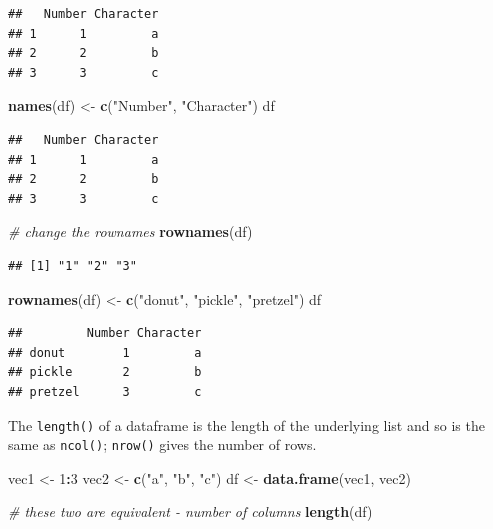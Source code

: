 \documentclass[
]{book}
\newenvironment{Shaded}{\begin{snugshade}}{\end{snugshade}}
\newcommand{\CommentTok}[1]{\textcolor[rgb]{0.56,0.35,0.01}{\textit{#1}}}
\newcommand{\DecValTok}[1]{\textcolor[rgb]{0.00,0.00,0.81}{#1}}
\newcommand{\FunctionTok}[1]{\textcolor[rgb]{0.13,0.29,0.53}{\textbf{#1}}}
\newcommand{\NormalTok}[1]{#1}
\newcommand{\OtherTok}[1]{\textcolor[rgb]{0.56,0.35,0.01}{#1}}
\newcommand{\SpecialCharTok}[1]{\textcolor[rgb]{0.81,0.36,0.00}{\textbf{#1}}}
\newcommand{\StringTok}[1]{\textcolor[rgb]{0.31,0.60,0.02}{#1}}
\begin{document}
\begin{verbatim}
##   Number Character
## 1      1         a
## 2      2         b
## 3      3         c
\end{verbatim}

\begin{Shaded}
\begin{Highlighting}[]
\FunctionTok{names}\NormalTok{(df) }\OtherTok{\textless{}{-}} \FunctionTok{c}\NormalTok{(}\StringTok{"Number"}\NormalTok{, }\StringTok{"Character"}\NormalTok{)}
\NormalTok{df}
\end{Highlighting}
\end{Shaded}

\begin{verbatim}
##   Number Character
## 1      1         a
## 2      2         b
## 3      3         c
\end{verbatim}

\begin{Shaded}
\begin{Highlighting}[]
\CommentTok{\# change the rownames}
\FunctionTok{rownames}\NormalTok{(df)}
\end{Highlighting}
\end{Shaded}

\begin{verbatim}
## [1] "1" "2" "3"
\end{verbatim}

\begin{Shaded}
\begin{Highlighting}[]
\FunctionTok{rownames}\NormalTok{(df) }\OtherTok{\textless{}{-}} \FunctionTok{c}\NormalTok{(}\StringTok{"donut"}\NormalTok{, }\StringTok{"pickle"}\NormalTok{, }\StringTok{"pretzel"}\NormalTok{)}
\NormalTok{df}
\end{Highlighting}
\end{Shaded}

\begin{verbatim}
##         Number Character
## donut        1         a
## pickle       2         b
## pretzel      3         c
\end{verbatim}

The \texttt{length()} of a dataframe is the length of the underlying list and so is the same as \texttt{ncol()}; \texttt{nrow()} gives the number of rows.

\begin{Shaded}
\begin{Highlighting}[]
\NormalTok{vec1 }\OtherTok{\textless{}{-}} \DecValTok{1}\SpecialCharTok{:}\DecValTok{3}
\NormalTok{vec2 }\OtherTok{\textless{}{-}} \FunctionTok{c}\NormalTok{(}\StringTok{"a"}\NormalTok{, }\StringTok{"b"}\NormalTok{, }\StringTok{"c"}\NormalTok{)}
\NormalTok{df }\OtherTok{\textless{}{-}} \FunctionTok{data.frame}\NormalTok{(vec1, vec2)}

\CommentTok{\# these two are equivalent {-} number of columns}
\FunctionTok{length}\NormalTok{(df)}
\end{Highlighting}
\end{Shaded}
\end{document}
